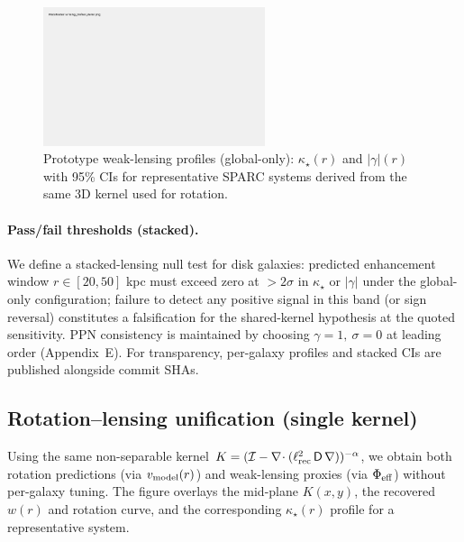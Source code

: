 \documentclass[fleqn,usenatbib]{mnras}
\begin{document}
\begin{figure}[h]
\centering
\includegraphics[width=0.58\textwidth]{results/lensing_profiles_demo.png}
\caption{Prototype weak-lensing profiles (global-only): $\kappa_\star(r)$ and $|\gamma|(r)$ with 95\% CIs for representative SPARC systems derived from the same 3D kernel used for rotation.}
\label{fig:lensing_profiles}
\end{figure}

\paragraph{Pass/fail thresholds (stacked).} We define a stacked-lensing null test for disk galaxies: predicted enhancement window $r\in[20,50]$ kpc must exceed zero at $>2\sigma$ in $\kappa_\star$ or $|\gamma|$ under the global-only configuration; failure to detect any positive signal in this band (or sign reversal) constitutes a falsification for the shared-kernel hypothesis at the quoted sensitivity. PPN consistency is maintained by choosing $\gamma=1,\ \sigma=0$ at leading order (Appendix~E). For transparency, per-galaxy profiles and stacked CIs are published alongside commit SHAs.

\subsection{Rotation–lensing unification (single kernel)}
\noindent Using the same non-separable kernel $K=(\mathcal I-\nabla\!\cdot(\ell_{\rm rec}^2\,\mathsf D\,\nabla))^{-\alpha}$, we obtain both rotation predictions (via $v_{\rm model}(r)$) and weak-lensing proxies (via $\Phi_{\rm eff}$) without per-galaxy tuning. The figure overlays the mid-plane $K(x,y)$, the recovered $w(r)$ and rotation curve, and the corresponding $\kappa_\star(r)$ profile for a representative system.
\end{document}
